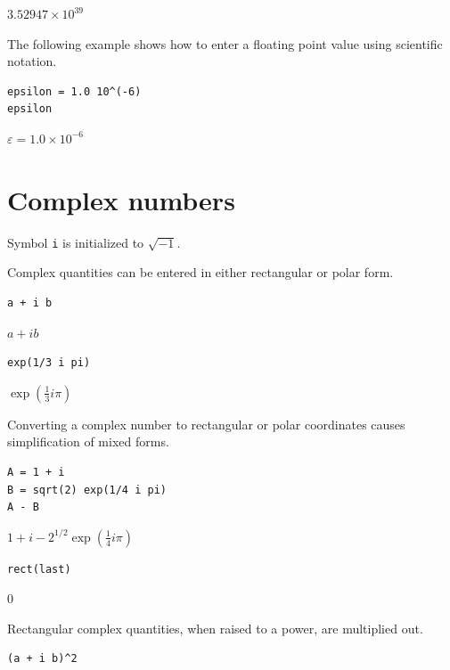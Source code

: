 \documentclass[12pt]{article}
\begin{document}
$\displaystyle 3.52947\times10^{39}$

\bigskip
The following example shows how to enter a floating point value
using scientific notation.

{\color{blue}
\begin{verbatim}
epsilon = 1.0 10^(-6)
epsilon
\end{verbatim}
}

$\displaystyle \varepsilon=1.0\times10^{-6}$

\newpage

\section{Complex numbers}

Symbol \verb$i$ is initialized to $\sqrt{-1}$.

\bigskip

Complex quantities can be entered in either rectangular or polar form.

{\color{blue}
\begin{verbatim}
a + i b
\end{verbatim}
}

$\displaystyle a+ib$

{\color{blue}
\begin{verbatim}
exp(1/3 i pi)
\end{verbatim}
}

$\displaystyle \exp\left(\tfrac{1}{3}i\pi\right)$

\bigskip

Converting a complex number to rectangular or polar coordinates causes
simplification of mixed forms.

{\color{blue}
\begin{verbatim}
A = 1 + i
B = sqrt(2) exp(1/4 i pi)
A - B
\end{verbatim}
}

$\displaystyle 1+i-2^{1/2}\exp\left(\tfrac{1}{4}i\pi\right)$

{\color{blue}
\begin{verbatim}
rect(last)
\end{verbatim}
}

$\displaystyle 0$

\bigskip

Rectangular complex quantities, when raised to a power, are multiplied out.

{\color{blue}
\begin{verbatim}
(a + i b)^2
\end{verbatim}
}
\end{document}
